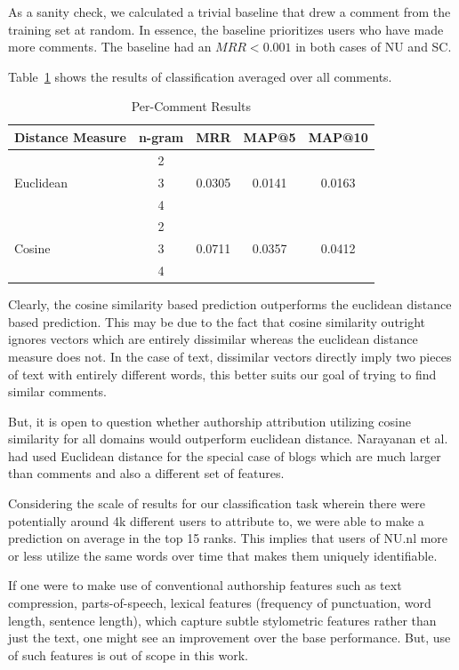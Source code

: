As a sanity check, we calculated a trivial baseline that drew a comment from the training set at random. In essence, the baseline prioritizes users who have made more comments. The baseline had an $MRR < 0.001$ in both cases of NU and SC.

Table~\ref{tab:com_results} shows the results of classification averaged over all comments. 

\begin{table}[!h]
\centering
\begin{tabular}{|l|c|c|c|c|}
\hline
 \textbf{Distance Measure} & \textbf{n-gram} & \textbf{MRR} & \textbf{MAP@5} & \textbf{MAP@10}\\ \hline
 \multirow{3}{*}{Euclidean}& 2 & & & \\ \cline{2-5}
 & 3 & 0.0305 & 0.0141 & 0.0163 \\ \cline{2-5}
 & 4 & & & \\ \hline
 \multirow{3}{*}{Cosine} & 2 & &  & \\ \cline{2-5}
 & 3 & 0.0711 & 0.0357 & 0.0412 \\ \cline{2-5}
 & 4 & & & \\ \hline
\end{tabular}
\caption{Per-Comment Results}
\label{tab:com_results}
\end{table}

Clearly, the cosine similarity based prediction outperforms the euclidean distance based prediction. This may be due to the fact that cosine similarity outright ignores vectors which are entirely dissimilar whereas the euclidean distance measure does not. In the case of text, dissimilar vectors directly imply two pieces of text with entirely different words, this better suits our goal of trying to find similar comments.

But, it is open to question whether authorship attribution utilizing cosine similarity for all domains would outperform euclidean distance. Narayanan et al. \cite{narayanan_feasibility_2012} had used Euclidean distance for the special case of blogs which are much larger than comments and also a different set of features.

Considering the scale of results for our classification task wherein there were potentially around 4k different users to attribute to, we were able to make a prediction on average in the top 15 ranks. This implies that users of NU.nl more or less utilize the same words over time that makes them uniquely identifiable.

If one were to make use of conventional authorship features such as text compression, parts-of-speech, lexical features (frequency of punctuation, word length, sentence length), which capture subtle stylometric features rather than just the text, one might see an improvement over the base performance. But, use of such features is out of scope in this work. 

